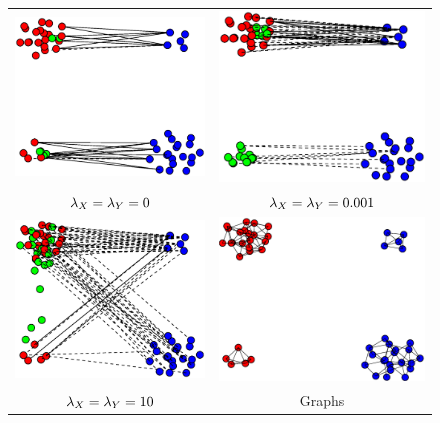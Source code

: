\begin{figure}\label{figlambda}
\centering
\begin{tabular}{@{}|@{}c@{}|@{}c@{}|@{}}
\hline
  \includegraphics[width=.4\linewidth]{../images/syntheticexamples/symmetricsyntheticmapping_l0_KX8_KY8_nn4} &  
  \includegraphics[width=.4\linewidth]{../images/syntheticexamples/symmetricsyntheticmapping_l0001_KX8_KY8_nn4} \\
	 {$\lambda_X=\lambda_Y=0$} & {$\lambda_X =\lambda_Y=0.001$}\\\hline
  \includegraphics[width=.4\linewidth]{../images/syntheticexamples/symmetricsyntheticmapping_l10_KX8_KY8_nn4} &
  \includegraphics[width=.4\linewidth]{../images/graph} \\  
  {$\lambda_X =\lambda_Y=10$} & Graphs \\\hline 

\end{tabular}
\end{figure}
